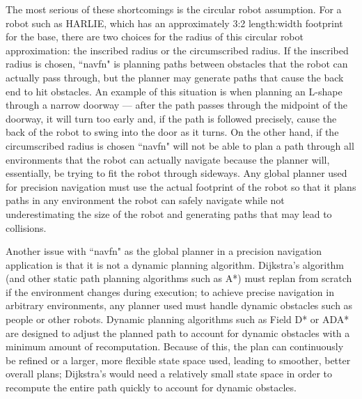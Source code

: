 The most serious of these shortcomings is the circular robot assumption. For a robot such as HARLIE, which has an approximately 3:2 length:width footprint for the base, there are two choices for the radius of this circular robot approximation: the inscribed radius or the circumscribed radius. If the inscribed radius is chosen, ``navfn" is planning paths between obstacles that the robot can actually pass through, but the planner may generate paths that cause the back end to hit obstacles. An example of this situation is when planning an L-shape through a narrow doorway --- after the path passes through the midpoint of the doorway, it will turn too early and, if the path is followed precisely, cause the back of the robot to swing into the door as it turns. On the other hand, if the circumscribed radius is chosen ``navfn" will not be able to plan a path through all environments that the robot can actually navigate because the planner will, essentially, be trying to fit the robot through sideways. Any global planner used for precision navigation must use the actual footprint of the robot so that it plans paths in any environment the robot can safely navigate while not underestimating the size of the robot and generating paths that may lead to collisions.

Another issue with ``navfn" as the global planner in a precision navigation application is that it is not a dynamic planning algorithm. Dijkstra's algorithm (and other static path planning algorithms such as A*) must replan from scratch if the environment changes during execution; to achieve precise navigation in arbitrary environments, any planner used must handle dynamic obstacles such as people or other robots. Dynamic planning algorithms such as Field D* \autocite{FieldDStar} or ADA* \autocites{ADAStar}{DBLP:journals/ai/LikhachevFGST08} are designed to adjust the planned path to account for dynamic obstacles with a minimum amount of recomputation. Because of this, the plan can continuously be refined or a larger, more flexible state space used, leading to smoother, better overall plans; Dijkstra's would need a relatively small state space in order to recompute the entire path quickly to account for dynamic obstacles.

